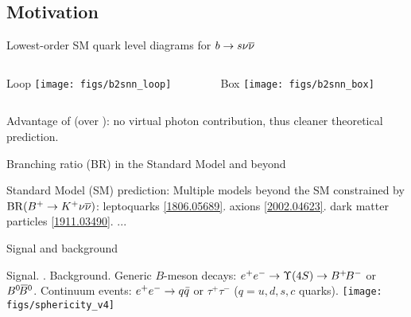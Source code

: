 \subsection{Motivation}
\begin{frame}{Lowest-order SM quark level diagrams for $b\rightarrow s\nu{\overline{\nu}}$}
\begin{columns}
\begin{column}{0.5\linewidth} 
\bi
\item Loop
\texttt{[image: figs/b2snn\_loop]}
\vspace{0.5cm}
\ei
\end{column}
\begin{column}{0.5\linewidth}
\bi
\item Box \hfill
\texttt{[image: figs/b2snn\_box]}
\vspace{0.5cm}
\ei
\end{column}
\end{columns}
\bi
\item Advantage of \nulnulb (over \ellell): no virtual photon contribution, thus cleaner theoretical prediction.
\ei
\end{frame}
\begin{frame}{Branching ratio (BR) in the Standard Model and beyond}
\bi
\item Standard Model (SM) prediction: 
\bi
{}
\ei
\itemi Multiple models beyond the SM constrained by $\mathrm{BR}(B^+\rightarrow K^+\nu{\overline{\nu}})$:
\bi
\itemi leptoquarks \hfill \href{https://arxiv.org/pdf/1806.05689.pdf}{\color{blue} [1806.05689]}.
\itemi axions \hfill \href{https://arxiv.org/pdf/2002.04623.pdf}{\color{blue} [2002.04623]}.
\itemi dark matter particles \hfill \href{https://arxiv.org/pdf/1911.03490.pdf}{\color{blue} [1911.03490]}.
\itemi ... 
\ei
\ei
\end{frame}
\begin{frame}{Signal and background}
\bi
\item Signal.
\bi
{}.
\ei
\itemii Background.
\bi
\itemii Generic $B$-meson decays: $\epem\to\Y4S\to\BpBm$ or $\BzBzb$.
\itemii Continuum events: $e^+e^-\rightarrow q\bar{q}$ or $\tau^{+}\tau^{-}$ ($q=u,d,s,c$ quarks). 
\ei
\ei
\vspace{0.5cm}
\centering
\texttt{[image: figs/sphericity\_v4]}
\end{frame}
